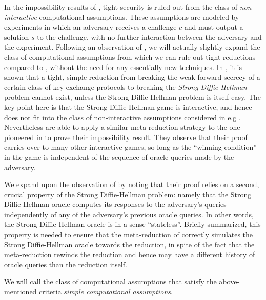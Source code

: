 In the impossibility results of ,
tight security is ruled out from the class of \emph{non-interactive}
computational assumptions.
These assumptions are modeled by experiments in which an adversary receives a challenge \(c\)
and must output a solution \(s\) to the challenge, with no further interaction between the adversary and the experiment.
Following an observation of , we will actually slightly expand the class of computational assumptions
from which we can rule out tight reductions
compared to , without the need for any essentially new techniques.
In , it is shown that a tight, simple reduction
from breaking the weak forward secrecy of a certain class of key exchange protocols
to breaking the \emph{Strong Diffie-Hellman} problem
cannot exist, unless the Strong Diffie-Hellman problem is itself easy.
The key point here is that the Strong Diffie-Hellman game is interactive,
and hence does not fit into the class of non-interactive assumptions considered in e.g .
Nevertheless  are able to apply a similar meta-reduction strategy
to the one pioneered in  to prove their impossibility result.
They observe that their proof carries over to many other
interactive games, so long as the ``winning condition''
in the game is independent of the sequence of oracle queries made by the adversary.

We expand upon the observation of 
by noting that their proof relies on a second, crucial property of the Strong Diffie-Hellman problem:
namely that the Strong Diffie-Hellman oracle computes its
responses to the adversary's queries
independently of any of the adversary's previous oracle queries.
In other words, the Strong Diffie-Hellman oracle is in a sense ``stateless''.
Briefly summarized,
this property is needed to ensure that
the meta-reduction of 
correctly simulates the Strong Diffie-Hellman oracle
towards the reduction, in spite of the fact
that the meta-reduction rewinds the reduction
and hence may have a different history of oracle queries
than the reduction itself.

We will call the class of computational assumptions
that satisfy the above-mentioned criteria
\emph{simple computational assumptions}.


